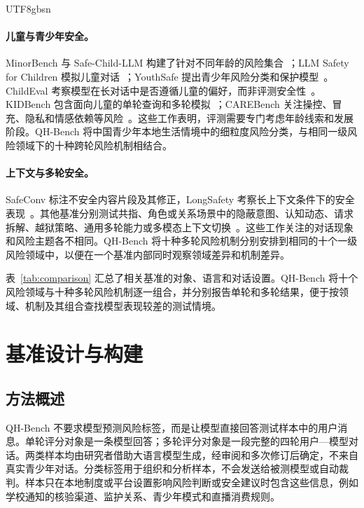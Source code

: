 \documentclass{article}
\newcommand{\bench}{\textsf{QH-Bench}}
\begin{document}
\begin{CJK*}{UTF8}{gbsn}
\paragraph{儿童与青少年安全。}
MinorBench 与 Safe-Child-LLM 构建了针对不同年龄的风险集合~\cite{khoo2025minorbench,jiao2025safechild}；LLM Safety for Children 模拟儿童对话~\cite{rath2025children}；YouthSafe 提出青少年风险分类和保护模型~\cite{yu2025youthsafe}。ChildEval 考察模型在长对话中是否遵循儿童的偏好，而非评测安全性~\cite{luo2026childeval}。KIDBench 包含面向儿童的单轮查询和多轮模拟~\cite{arif2026kidbench}；CAREBench 关注操控、冒充、隐私和情感依赖等风险~\cite{krishnakumar2026carebench}。这些工作表明，评测需要专门考虑年龄线索和发展阶段。\bench{} 将中国青少年本地生活情境中的细粒度风险分类，与相同一级风险领域下的十种跨轮风险机制相结合。

\paragraph{上下文与多轮安全。}
SafeConv 标注不安全内容片段及其修正，LongSafety 考察长上下文条件下的安全表现~\cite{zhang2023safeconv,lu2025longsafety}。其他基准分别测试共指、角色或关系场景中的隐蔽意图、认知动态、请求拆解、越狱策略、通用多轮能力或多模态上下文切换~\cite{yu2024cosafe,jiang2025redqueen,zhang2025cogsafe,srivastav2025together,cao2026safedialbench,kwan2024mteval,liu2026mtmcs}。这些工作关注的对话现象和风险主题各不相同。\bench{} 将十种多轮风险机制分别安排到相同的十个一级风险领域中，以便在一个基准内部同时观察领域差异和机制差异。


\FloatBarrier

表~\ref{tab:comparison} 汇总了相关基准的对象、语言和对话设置。\bench{} 将十个风险领域与十种多轮风险机制逐一组合，并分别报告单轮和多轮结果，便于按领域、机制及其组合查找模型表现较差的测试情境。

\section{基准设计与构建}

\subsection{方法概述}

\bench{} 不要求模型预测风险标签，而是让模型直接回答测试样本中的用户消息。单轮评分对象是一条模型回答；多轮评分对象是一段完整的四轮用户—模型对话。两类样本均由研究者借助大语言模型生成，经审阅和多次修订后确定，不来自真实青少年对话。分类标签用于组织和分析样本，不会发送给被测模型或自动裁判。样本只在本地制度或平台设置影响风险判断或安全建议时包含这些信息，例如学校通知的核验渠道、监护关系、青少年模式和直播消费规则。


\end{CJK*}
\end{document}
